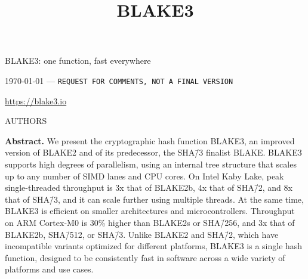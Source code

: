 \documentclass[11pt,notitlepage,a4paper]{article}
\title{BLAKE3}
\begin{document}
\selectfont

\pagestyle{plain}

\begin{center}
{\huge BLAKE3: one function, fast everywhere}

\bigskip

\mydate\today 
\quad---\quad
{\large \tt REQUEST FOR COMMENTS, NOT A FINAL VERSION}

\medskip

\url{https://blake3.io}

\medskip

AUTHORS
\end{center}


\medskip

\begin{center}
  \begin{minipage}{0.92\linewidth}

      \textbf{Abstract.} We present the cryptographic hash function BLAKE3, an
      improved version of BLAKE2 and of its predecessor, the SHA\=/3 finalist
      BLAKE. BLAKE3 supports high degrees of parallelism, using an internal
      tree structure that scales up to any number of SIMD lanes and CPU cores.
      On Intel Kaby Lake, peak single-threaded throughput is 3x that of
      BLAKE2b, 4x that of SHA\=/2, and 8x that of SHA\=/3, and it can scale
      further using multiple threads. At the same time, BLAKE3 is efficient on
      smaller architectures and microcontrollers. Throughput on ARM Cortex-M0
      is 30\% higher than BLAKE2s or SHA\=/256, and 3x that of BLAKE2b,
      SHA\=/512, or SHA\=/3. Unlike BLAKE2 and SHA\=/2, which have incompatible
      variants optimized for different platforms, BLAKE3 is a single hash
      function, designed to be consistently fast in software across a wide
      variety of platforms and use cases.

   \end{minipage}
\end{center}
\end{document}
